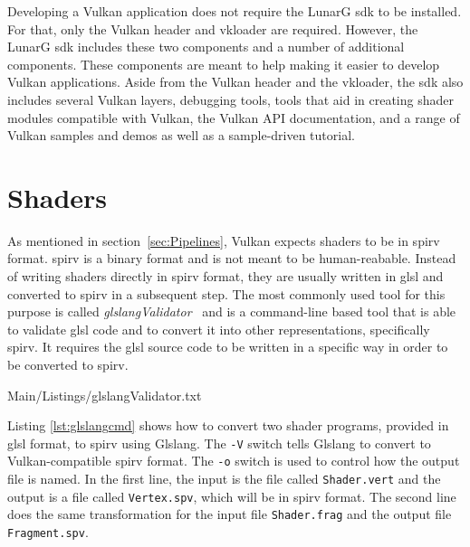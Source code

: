     Developing a Vulkan application does not require the LunarG \gls{sdk} to be installed.
    For that, only the Vulkan header and \gls{vkloader} are required.
    However, the LunarG \gls{sdk} includes these two components and a number of additional components.
    These components are meant to help making it easier to develop Vulkan applications.
    Aside from the Vulkan header and the \gls{vkloader}, the \gls{sdk} also includes several Vulkan layers, debugging tools, tools that aid in creating shader modules compatible with Vulkan, the Vulkan API documentation, and a range of Vulkan samples and demos as well as a sample-driven tutorial.



  \section{Shaders}
  \label{sec:EnvShaders}
    As mentioned in section~\ref{sec:Pipelines}, Vulkan expects shaders to be in \gls{spirv} format.
    \gls{spirv} is a binary format and is not meant to be human-reabable.
    Instead of writing shaders directly in \gls{spirv} format, they are usually written in \gls{glsl} and converted to \gls{spirv} in a subsequent step.
    The most commonly used tool for this purpose is called \textit{glslangValidator}~\cite{glslangrepo} and is a command-line based tool that is able to validate \gls{glsl} code and to convert it into other representations, specifically \gls{spirv}.
    It requires the \gls{glsl} source code to be written in a specific way in order to be converted to \gls{spirv}.


    
    {Main/Listings/glslangValidator.txt}

    Listing \ref{lst:glslangcmd} shows how to convert two shader programs, provided in \gls{glsl} format, to \gls{spirv} using Glslang.
    The \lstinline{-V} switch tells Glslang to convert to Vulkan-compatible \gls{spirv} format.
    The \lstinline{-o} switch is used to control how the output file is named.
    In the first line, the input is the file called \lstinline{Shader.vert} and the output is a file called \lstinline{Vertex.spv}, which will be in \gls{spirv} format.
    The second line does the same transformation for the input file \lstinline{Shader.frag} and the output file \lstinline{Fragment.spv}.

